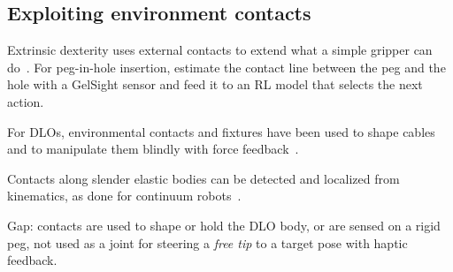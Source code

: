 \subsection{Exploiting environment contacts}
\begin{outline}
  \item Extrinsic dexterity uses external contacts to extend what a simple
    gripper can do~\cite{dafle2014extrinsic}. For peg-in-hole insertion,
    \citet{kr-aecsagphi-22} estimate the contact line between the peg and the
    hole with a GelSight sensor and feed it to an RL model that selects the
    next action.
  \item For DLOs, environmental contacts and fixtures have been used to shape
    cables~\cite{zhu2020environmental} and to manipulate them blindly with
    force feedback~\cite{slk-ftmdloeffi-22}.
  \item Contacts along slender elastic bodies can be detected and localized
    from kinematics, as done for continuum robots~\cite{bajo2012kinematics}.
  \item Gap: contacts are used to shape or hold the DLO body, or are sensed on a
    rigid peg, not used as a joint for steering a \emph{free tip} to a target
    pose with haptic feedback.
\end{outline}

